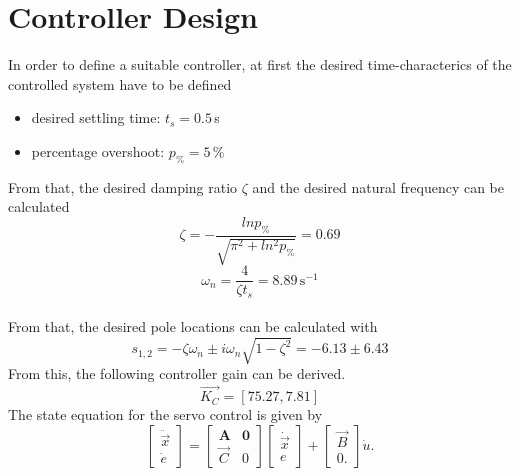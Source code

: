\section{Controller Design}
\label{chap:contr_des}
In order to define a suitable controller, at first the desired time-characterics of the controlled system have to be defined
\begin{itemize}
\item desired settling time: $t_s = 0.5\,$s 
    \item percentage overshoot: $p_\% = 5\,$\%
\end{itemize}
From that, the desired damping ratio $\zeta$ and the  desired natural frequency can be calculated
\begin{equation}
    \zeta = -\frac{ln p_\%}{\sqrt{\pi^2+ln^2p_\%}} = 0.69
\end{equation}
\begin{equation}
    \omega_n = \frac{4}{\zeta t_s} = 8.89\, \text{s}^{-1}
\end{equation}
\\From that, the desired pole locations can be calculated with
\begin{equation}
    s_{1,2} = -\zeta\omega_n \pm i\omega_n\sqrt{1-\zeta^2} = -6.13\pm6.43
    \label{eqn:poles}
\end{equation}
\vspace{0.5cm}
From this, the following controller gain can be derived. 
\begin{equation}
    \vec{K_C} = [75.27, 7.81]
\end{equation}
The state equation for the servo control is given by 
\begin{equation}
    \left[\begin{array}{c}
    \ddot{\vec{x}} \\
    \dot{e}
    \end{array}\right]=\left[\begin{array}{cc}
    \mathbf{A} & \mathbf{0} \\
    \vec{C} & 0
    \end{array}\right]\left[\begin{array}{l}
    \dot{\vec{x}} \\
    e
    \end{array}\right]+\left[\begin{array}{c}
    \vec{B} \\
    0.
    \end{array}\right] \dot{u}.
\end{equation}
